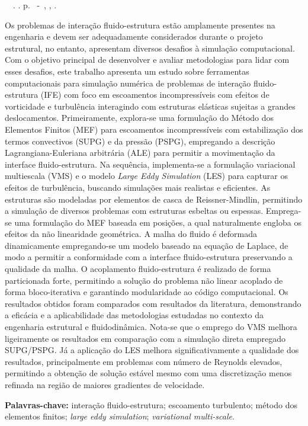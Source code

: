 \setlength{\absparsep}{18pt} %
\begin{resumo}
	\begin{flushleft}
		\setlength{\absparsep}{0pt} %
		\SingleSpacing
		\imprimirautorabr~~\textbf{\imprimirtituloresumo}.	\imprimirdata. \pageref{LastPage} p.
		\imprimirtipotrabalho~-~\imprimirinstituicao, \imprimirlocal, \imprimirdata.
	\end{flushleft}
	\OnehalfSpacing

	Os problemas de interação fluido-estrutura estão amplamente presentes na engenharia e devem ser adequadamente considerados durante o projeto estrutural, no entanto, apresentam diversos desafios à simulação computacional. Com o objetivo principal de desenvolver e avaliar metodologias para lidar com esses desafios, este trabalho apresenta um estudo sobre ferramentas computacionais para simulação numérica de problemas de interação fluido-estrutura (IFE) com foco em escoamentos incompressíveis com efeitos de vorticidade e turbulência interagindo com estruturas elásticas sujeitas a grandes deslocamentos. Primeiramente, explora-se uma formulação do Método dos Elementos Finitos (MEF) para escoamentos incompressíveis com estabilização dos termos convectivos (SUPG) e da pressão (PSPG), empregando a descrição Lagrangiana-Euleriana arbitrária (ALE) para permitir a movimentação da interface fluido-estrutura. Na sequência, implementa-se a formulação variacional multiescala (VMS) e o modelo \textit{Large Eddy Simulation} (LES) para capturar os efeitos de turbulência, buscando simulações mais realistas e eficientes. As estruturas são modeladas por elementos de casca de Reissner-Mindlin, permitindo a simulação de diversos problemas com estruturas esbeltas ou espessas. Emprega-se uma formulação do MEF baseada em posições, a qual naturalmente engloba os efeitos da não linearidade geométrica. A malha do fluido é deformada dinamicamente empregando-se um modelo baseado na equação de Laplace, de modo a permitir a conformidade com a interface fluido-estrutura preservando a qualidade da malha. O acoplamento fluido-estrutura é realizado de forma particionada forte, permitindo a solução do problema não linear acoplado de forma bloco-iterativa e garantindo modularidade ao código computacional. Os resultados obtidos foram comparados com resultados da literatura, demonstrando a eficácia e a aplicabilidade das metodologias estudadas no contexto da engenharia estrutural e fluidodinâmica. Nota-se que o emprego do VMS melhora ligeiramente os resultados em comparação com a simulação direta empregado SUPG/PSPG. Já a aplicação do LES melhora significativamente a qualidade dos resultados, principalmente em problemas com número de Reynolds elevados, permitindo a obtenção de solução estável mesmo com uma discretização menos refinada na região de maiores gradientes de velocidade.

	\textbf{Palavras-chave:} interação fluido-estrutura; escoamento turbulento; método dos elementos finitos; \textit{large eddy simulation}; \textit{variational multi-scale}.
\end{resumo}